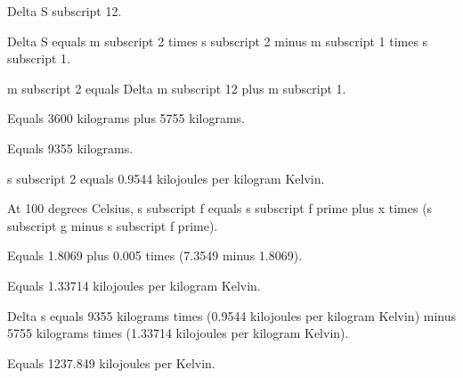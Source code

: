 Delta S subscript 12.

Delta S equals m subscript 2 times s subscript 2 minus m subscript 1 times s subscript 1.

m subscript 2 equals Delta m subscript 12 plus m subscript 1.

Equals 3600 kilograms plus 5755 kilograms.

Equals 9355 kilograms.

s subscript 2 equals 0.9544 kilojoules per kilogram Kelvin.

At 100 degrees Celsius, s subscript f equals s subscript f prime plus x times (s subscript g minus s subscript f prime).

Equals 1.8069 plus 0.005 times (7.3549 minus 1.8069).

Equals 1.33714 kilojoules per kilogram Kelvin.

Delta s equals 9355 kilograms times (0.9544 kilojoules per kilogram Kelvin) minus 5755 kilograms times (1.33714 kilojoules per kilogram Kelvin).

Equals 1237.849 kilojoules per Kelvin.